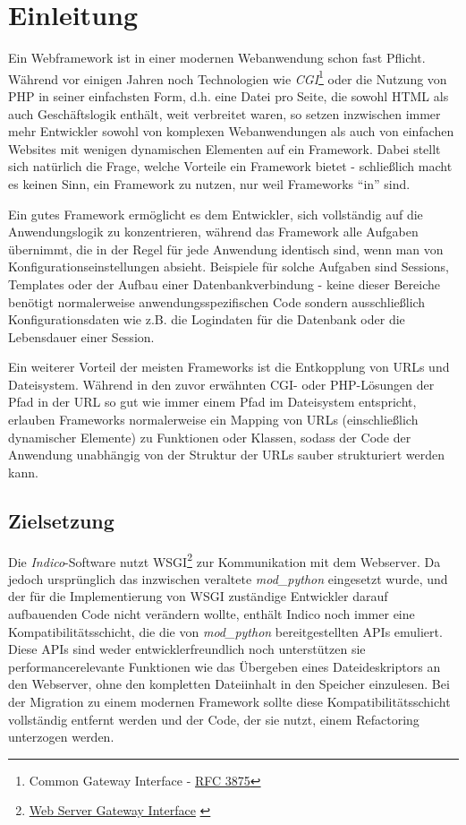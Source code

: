 \chapter{Einleitung}

Ein Webframework ist in einer modernen Webanwendung schon fast Pflicht. Während vor einigen
Jahren noch Technologien wie \emph{CGI}\footnote{Common Gateway Interface -
\href{http://www.ietf.org/rfc/rfc3875}{RFC 3875}\citep{rfc3875}} oder die Nutzung von PHP in seiner
einfachsten Form, d.h. eine Datei pro Seite, die sowohl HTML als auch Geschäftslogik enthält, weit
verbreitet waren, so setzen inzwischen immer mehr Entwickler sowohl von komplexen Webanwendungen als
auch von einfachen Websites mit wenigen dynamischen Elementen auf ein Framework. Dabei stellt sich
natürlich die Frage, welche Vorteile ein Framework bietet - schließlich macht es keinen Sinn, ein
Framework zu nutzen, nur weil Frameworks \enquote{in} sind.

Ein gutes Framework ermöglicht es dem Entwickler, sich vollständig auf die Anwendungslogik zu
konzentrieren, während das Framework alle Aufgaben übernimmt, die in der Regel für jede Anwendung
identisch sind, wenn man von Konfigurationseinstellungen absieht. Beispiele für solche Aufgaben sind
Sessions, Templates oder der Aufbau einer Datenbankverbindung - keine dieser Bereiche benötigt
normalerweise anwendungsspezifischen Code sondern ausschließlich Konfigurationsdaten wie z.B. die
Logindaten für die Datenbank oder die Lebensdauer einer Session.

Ein weiterer Vorteil der meisten Frameworks ist die Entkopplung von URLs und Dateisystem.
Während in den zuvor erwähnten CGI- oder PHP-Lösungen der Pfad in der URL so gut wie immer einem
Pfad im Dateisystem entspricht, erlauben Frameworks normalerweise ein Mapping von URLs
(einschließlich dynamischer Elemente) zu Funktionen oder Klassen, sodass der Code der Anwendung
unabhängig von der Struktur der URLs sauber strukturiert werden kann.


\section{Zielsetzung}

Die \emph{Indico}-Software nutzt WSGI\footnote{\href{http://www.python.org/dev/peps/pep-0333/}{Web
Server Gateway Interface} \citep{wsgi}} zur Kommunikation mit dem Webserver. Da jedoch ursprünglich
das inzwischen veraltete \emph{mod\_python} eingesetzt wurde, und der für die Implementierung von
WSGI zuständige Entwickler darauf aufbauenden Code nicht verändern wollte, enthält Indico noch immer
eine Kompatibilitätsschicht, die die von \emph{mod\_python} bereitgestellten APIs emuliert. Diese
APIs sind weder entwicklerfreundlich noch unterstützen sie performancerelevante Funktionen wie das
Übergeben eines Dateideskriptors an den Webserver, ohne den kompletten
Dateiinhalt in den Speicher einzulesen. Bei der Migration zu einem modernen Framework sollte diese
Kompatibilitätsschicht vollständig entfernt werden und der Code, der sie nutzt, einem Refactoring
unterzogen werden.

